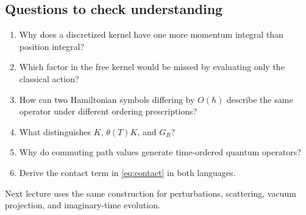\documentclass[11pt]{article}
\begin{document}
\subsection*{Questions to check understanding}
\begin{enumerate}
\item Why does a discretized kernel have one more momentum integral
than position integral?
\item Which factor in the free kernel would be missed by evaluating
only the classical action?
\item How can two Hamiltonian symbols differing by \(O(\hbar)\)
describe the same operator under different ordering prescriptions?
\item What distinguishes \(K\), \(\theta(T)K\), and \(G_R\)?
\item Why do commuting path values generate time-ordered quantum operators?
\item Derive the contact term in \eqref{eq:contact} in both languages.
\end{enumerate}
Next lecture uses the same construction for perturbations, scattering,
vacuum projection, and imaginary-time evolution.
\end{document}
